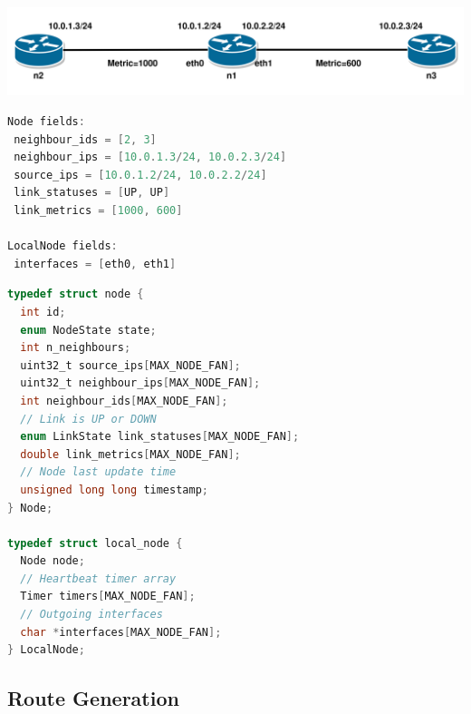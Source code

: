 \documentclass[withindex,glossary,openany]{cam-thesis}
\begin{document}
\begin{center}
\begin{minipage}{0.9\textwidth} \centering
	\includegraphics[width=1\textwidth]{node}
	\label{fig:node_ex}
\end{minipage}
\end{center}

\begin{minipage}{1\textwidth} \centering
\begin{lstlisting}[language=C, label=node_ex_listing, frame=tb, columns=fullflexible, caption=Partial example of fields of \texttt{Node} and \texttt{LocalNode}]
Node fields:
 neighbour_ids = [2, 3]
 neighbour_ips = [10.0.1.3/24, 10.0.2.3/24]
 source_ips = [10.0.1.2/24, 10.0.2.2/24]
 link_statuses = [UP, UP]
 link_metrics = [1000, 600]

LocalNode fields:
 interfaces = [eth0, eth1]
\end{lstlisting}
\end{minipage}

\begin{minipage}{1\textwidth} \centering
\begin{lstlisting}[language=C, label=node_data_structs, frame=tb, columns=fullflexible, caption=C source code for \texttt{Node} and \texttt{LocalNode} data structures]
typedef struct node {
  int id;
  enum NodeState state;
  int n_neighbours;
  uint32_t source_ips[MAX_NODE_FAN];
  uint32_t neighbour_ips[MAX_NODE_FAN];
  int neighbour_ids[MAX_NODE_FAN];
  // Link is UP or DOWN
  enum LinkState link_statuses[MAX_NODE_FAN];
  double link_metrics[MAX_NODE_FAN];
  // Node last update time
  unsigned long long timestamp;
} Node;

typedef struct local_node {
  Node node;
  // Heartbeat timer array
  Timer timers[MAX_NODE_FAN];
  // Outgoing interfaces
  char *interfaces[MAX_NODE_FAN];
} LocalNode;
\end{lstlisting}
\end{minipage}

\subsection{Route Generation}
\end{document}
